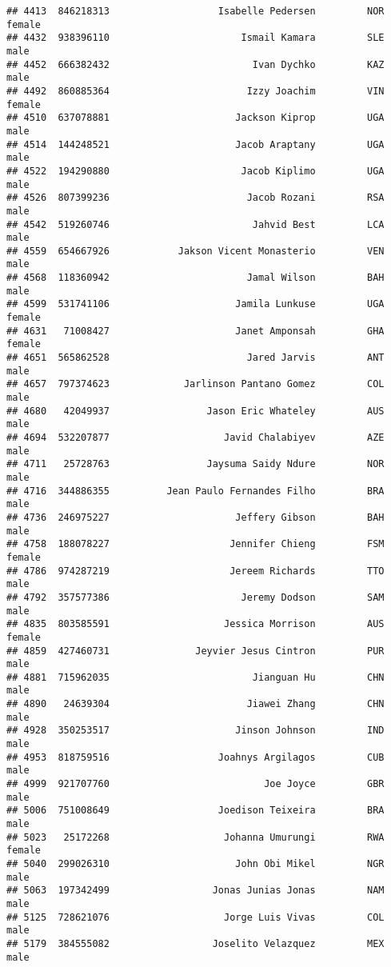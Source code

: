 \documentclass[]{article}
\begin{document}
\begin{verbatim}
## 4413  846218313                   Isabelle Pedersen         NOR female
## 4432  938396110                       Ismail Kamara         SLE   male
## 4452  666382432                         Ivan Dychko         KAZ   male
## 4492  860885364                        Izzy Joachim         VIN female
## 4510  637078881                      Jackson Kiprop         UGA   male
## 4514  144248521                      Jacob Araptany         UGA   male
## 4522  194290880                       Jacob Kiplimo         UGA   male
## 4526  807399236                        Jacob Rozani         RSA   male
## 4542  519260746                         Jahvid Best         LCA   male
## 4559  654667926            Jakson Vicent Monasterio         VEN   male
## 4568  118360942                        Jamal Wilson         BAH   male
## 4599  531741106                      Jamila Lunkuse         UGA female
## 4631   71008427                      Janet Amponsah         GHA female
## 4651  565862528                        Jared Jarvis         ANT   male
## 4657  797374623             Jarlinson Pantano Gomez         COL   male
## 4680   42049937                 Jason Eric Whateley         AUS   male
## 4694  532207877                    Javid Chalabiyev         AZE   male
## 4711   25728763                 Jaysuma Saidy Ndure         NOR   male
## 4716  344886355          Jean Paulo Fernandes Filho         BRA   male
## 4736  246975227                      Jeffery Gibson         BAH   male
## 4758  188078227                     Jennifer Chieng         FSM female
## 4786  974287219                     Jereem Richards         TTO   male
## 4792  357577386                       Jeremy Dodson         SAM   male
## 4835  803585591                    Jessica Morrison         AUS female
## 4859  427460731               Jeyvier Jesus Cintron         PUR   male
## 4881  715962035                         Jianguan Hu         CHN   male
## 4890   24639304                        Jiawei Zhang         CHN   male
## 4928  350253517                      Jinson Johnson         IND   male
## 4953  818759516                   Joahnys Argilagos         CUB   male
## 4999  921707760                           Joe Joyce         GBR   male
## 5006  751008649                   Joedison Teixeira         BRA   male
## 5023   25172268                    Johanna Umurungi         RWA female
## 5040  299026310                      John Obi Mikel         NGR   male
## 5063  197342499                  Jonas Junias Jonas         NAM   male
## 5125  728621076                    Jorge Luis Vivas         COL   male
## 5179  384555082                  Joselito Velazquez         MEX   male

\end{verbatim}
\end{document}
